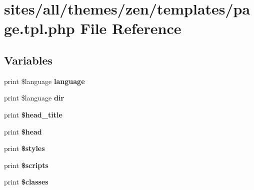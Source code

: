 \hypertarget{sites_2all_2themes_2zen_2templates_2page_8tpl_8php}{
\section{sites/all/themes/zen/templates/page.tpl.php File Reference}
\label{sites_2all_2themes_2zen_2templates_2page_8tpl_8php}
}
\subsection*{Variables}
\begin{CompactItemize}
\item 
\hypertarget{sites_2all_2themes_2zen_2templates_2page_8tpl_8php_42cd582c44c919666b05626f0b2a39d3}{
print \$language \textbf{language}}
\label{sites_2all_2themes_2zen_2templates_2page_8tpl_8php_42cd582c44c919666b05626f0b2a39d3}

\item 
\hypertarget{sites_2all_2themes_2zen_2templates_2page_8tpl_8php_9046a842bdd63fcdce32768992ca7e93}{
print \$language \textbf{dir}}
\label{sites_2all_2themes_2zen_2templates_2page_8tpl_8php_9046a842bdd63fcdce32768992ca7e93}

\item 
\hypertarget{sites_2all_2themes_2zen_2templates_2page_8tpl_8php_107cec09f27fd63715a39ba222571e1e}{
print \textbf{\$head\_\-title}}
\label{sites_2all_2themes_2zen_2templates_2page_8tpl_8php_107cec09f27fd63715a39ba222571e1e}

\item 
\hypertarget{sites_2all_2themes_2zen_2templates_2page_8tpl_8php_2758cd2886f39b56c05b61ab6cec7a5d}{
print \textbf{\$head}}
\label{sites_2all_2themes_2zen_2templates_2page_8tpl_8php_2758cd2886f39b56c05b61ab6cec7a5d}

\item 
\hypertarget{sites_2all_2themes_2zen_2templates_2page_8tpl_8php_8f1db0526d0e6b99ae580d83209e717f}{
print \textbf{\$styles}}
\label{sites_2all_2themes_2zen_2templates_2page_8tpl_8php_8f1db0526d0e6b99ae580d83209e717f}

\item 
\hypertarget{sites_2all_2themes_2zen_2templates_2page_8tpl_8php_2163fdf9fe7af884a6291084c2811896}{
print \textbf{\$scripts}}
\label{sites_2all_2themes_2zen_2templates_2page_8tpl_8php_2163fdf9fe7af884a6291084c2811896}

\item 
\hypertarget{sites_2all_2themes_2zen_2templates_2page_8tpl_8php_6d48ecbdbc70ca1812e665169b5fa1e2}{
print \textbf{\$classes}}
\label{sites_2all_2themes_2zen_2templates_2page_8tpl_8php_6d48ecbdbc70ca1812e665169b5fa1e2}


\end{CompactItemize}
